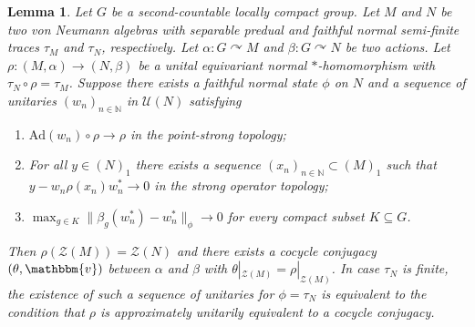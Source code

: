 \documentclass[11pt,a4paper]{article}
\newtheorem{lemma}[theorem]{Lemma}
\theoremstyle{definition}
\theoremstyle{remark}
\numberwithin{equation}{section}
\numberwithin{theorem}{section}
\newcommand{\N}{\mathbb{N}}
\newcommand{\acts}{\curvearrowright}
\begin{document}
\begin{lemma} \label{lemma:one-sided_intertwining} 
Let $G$ be a second-countable locally compact group.
Let $M$ and $N$ be two von Neumann algebras with separable predual and faithful normal semi-finite traces $\tau_{M}$ and $\tau_{N}$, respectively. 
Let $\alpha\colon G \acts M$ and $\beta\colon G \acts N$ be two actions.
Let $\rho\colon (M, \alpha) \rightarrow (N, \beta)$ be a unital equivariant normal $*$-homomorphism with $\tau_N \circ \rho = \tau_M$.
Suppose there exists a faithful normal state $\phi$ on $N$ and a sequence of unitaries $(w_n)_{n \in \N}$ in $\mathcal{U}(N)$ satisfying
\begin{enumerate}[leftmargin=*,label=$\bullet$]
\item $\mathrm{Ad}(w_n) \circ \rho \to \rho$ in the point-strong topology; 
\item For all $y \in (N)_1$ there exists a sequence $(x_n)_{n \in \N} \subset (M)_1$ such that $y -  w_n\rho(x_n)w_n^* \rightarrow 0$ in the strong operator topology;
\item $\max_{g \in K} \|\beta_g(w_n^*) - w_n^*\|_\phi \rightarrow 0$ for every compact subset $K \subseteq G$.
\end{enumerate}
Then $\rho(\mathcal{Z}(M))=\mathcal{Z}(N)$ and there exists a cocycle conjugacy $(\theta,\mathbbm{v})$ between $\alpha$ and $\beta$ with $\theta|_{\mathcal{Z}(M)}=\rho|_{\mathcal{Z}(M)}$.
In case $\tau_N$ is finite, the existence of such a sequence of unitaries for $\phi = \tau_N$ is equivalent to the condition that $\rho$ is approximately unitarily equivalent to a cocycle conjugacy.
\end{lemma}
\end{document}
